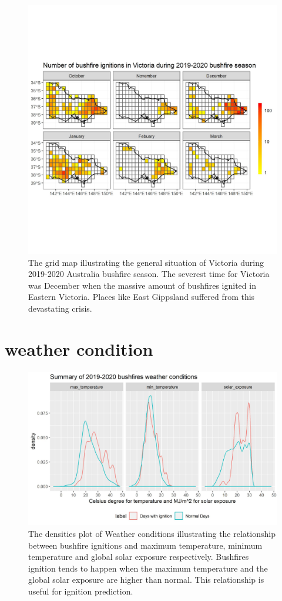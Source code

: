 \documentclass{monashthesis}
\begin{document}
\begin{figure}
\centering
\includegraphics[width=5.20833in]{figures/number_of_ignitions.jpg}
\caption{The grid map illustrating the general situation of Victoria
during 2019-2020 Australia bushfire season. The severest time for
Victoria was December when the massive amount of bushfires ignited in
Eastern Victoria. Places like East Gippsland suffered from this
devastating crisis.}
\end{figure}

\section{weather condition}\label{weather-condition}

\begin{figure}
\centering
\includegraphics[width=5.20833in]{figures/current_weather_condition.jpg}
\caption{The densities plot of Weather conditions illustrating the
relationship between bushfire ignitions and maximum temperature, minimum
temperature and global solar exposure respectively. Bushfires ignition
tends to happen when the maximum temperature and the global solar
exposure are higher than normal. This relationship is useful for
ignition prediction. \label{fig:weather-conditions}}
\end{figure}
\end{document}
